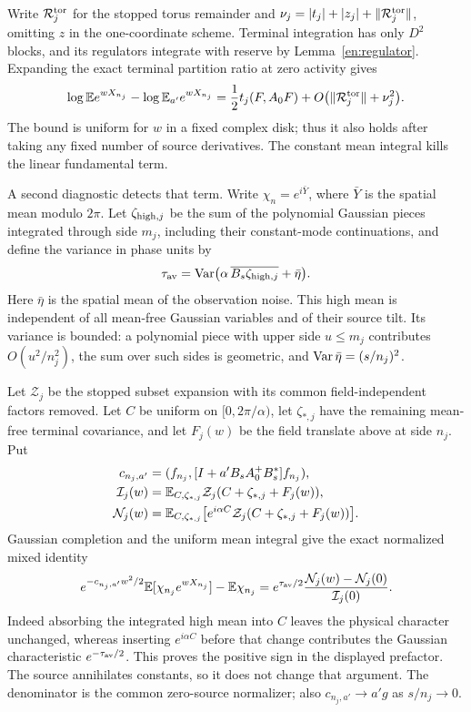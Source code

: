Write $\mathcal R_j^{\rm tor}$ for the stopped torus remainder and
$\nu_j=|t_j|+|z_j|+\|\mathcal R_j^{\rm tor}\|$, omitting $z$
in the one-coordinate scheme.  Terminal integration has only
$D^2$ blocks, and its regulators integrate with reserve by
Lemma~\ref{en:regulator}.  Expanding the exact terminal
partition ratio at zero activity gives
\begin{equation}\label{ep:gradient-diagnostic}
 \log\mathbb E e^{wX_{n_j}}-\log\mathbb E_{a'}e^{wX_{n_j}}
 =\frac12t_j(F,A_0F)
       +O\bigl(\|\mathcal R_j^{\rm tor}\|+\nu_j^2\bigr).
\end{equation}
The bound is uniform for $w$ in a fixed complex disk; thus it also
holds after taking any fixed number of source derivatives.  The
constant mean integral kills the linear fundamental term.

A second diagnostic detects that term.  Write
$\chi_n=e^{i\bar Y}$, where $\bar Y$ is the spatial mean modulo
$2\pi$.  Let $\zeta_{{\rm high},j}$ be the sum of the polynomial
Gaussian pieces integrated through side $m_j$, including their
constant-mode continuations, and define the variance in phase units by
\[
 \tau_{\rm av}
 =\operatorname{Var}\bigl(\alpha\,\overline{B_s\zeta_{{\rm high},j}}+\bar\eta\bigr).
\]
Here $\bar\eta$ is the spatial mean of the observation noise.
This high mean is independent of all mean-free Gaussian variables
and of their source tilt.  Its variance is bounded: a polynomial
piece with upper side $u\le m_j$ contributes $O(u^2/n_j^2)$, the
sum over such sides is geometric, and
$\operatorname{Var}\bar\eta=(s/n_j)^2$.

Let $\mathcal Z_j$ be the stopped subset expansion with its common
field-independent factors removed.  Let $C$ be uniform on
$[0,2\pi/\alpha)$, let $\zeta_{*,j}$ have the remaining mean-free
terminal covariance, and let $F_j(w)$ be the field translate above
at side $n_j$.  Put
\[
 \begin{split}
 c_{n_j,a'}&=(f_{n_j},[I+a'B_sA_0^+B_s^*]f_{n_j}),\\
 \mathcal I_j(w)&=\mathbb E_{C,\zeta_{*,j}}
       \mathcal Z_j(C+\zeta_{*,j}+F_j(w)),\\
 \mathcal N_j(w)&=\mathbb E_{C,\zeta_{*,j}}
       \bigl[e^{i\alpha C}\mathcal Z_j(C+\zeta_{*,j}+F_j(w))\bigr].
 \end{split}
\]
Gaussian completion and the uniform mean integral give the exact
normalized mixed identity
\[
 e^{-c_{n_j,a'}w^2/2}\mathbb E[\chi_{n_j}e^{wX_{n_j}}]
       -\mathbb E\chi_{n_j}
 =e^{\tau_{\rm av}/2}
       \frac{\mathcal N_j(w)-\mathcal N_j(0)}{\mathcal I_j(0)} .
\]
Indeed absorbing the integrated high mean into $C$ leaves the
physical character unchanged, whereas inserting $e^{i\alpha C}$
before that change contributes the Gaussian characteristic
$e^{-\tau_{\rm av}/2}$.  This proves the positive sign in the
displayed prefactor.  The source annihilates constants, so it does
not change that argument.  The denominator is the common zero-source
normalizer; also $c_{n_j,a'}\to a'g$ as $s/n_j\to0$.


